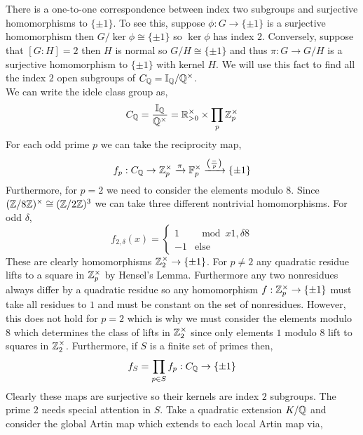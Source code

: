 \documentclass[12pt]{extarticle}
\begin{document}
\section{} 
There is a one-to-one correspondence between index two subgroups and surjective homomorphisms to $\{ \pm 1 \}$. To see this, suppose $\phi : G \to \{ \pm 1 \}$ is a surjective homomorphism then $G/ \ker{\phi} \cong \{ \pm 1 \}$ so $\ker{\phi}$ has index $2$. Conversely, suppose that $[G : H] = 2$ then $H$ is normal so $G/H \cong \{ \pm 1 \}$ and thus $\pi : G \to G/H$ is a surjective homomorphism to $\{ \pm 1 \}$ with kernel $H$. We will use this fact to find all the index $2$ open subgroups of $C_{\mathbb{Q}} = \mathbb{I}_{\mathbb{Q}} / \mathbb{Q}^\times$.
\bigskip\\
We can write the idele class group as,
\[ C_{\mathbb{Q}} = \frac{\mathbb{I}_{\mathbb{Q}}}{\mathbb{Q}^\times} = \mathbb{R}^\times_{> 0} \times \prod_p \mathbb{Z}_p^\times \]
For each odd prime $p$ we can take the reciprocity map, 
\[ f_p : C_{\mathbb{Q}} \to \mathbb{Z}_p^\times \xrightarrow{\pi} \mathbb{F}_{p}^\times \xrightarrow{\left(\frac{-}{p} \right)} \{ \pm 1 \} \]
Furthermore, for $p = 2$ we need to consider the elements modulo $8$. Since $(\mathbb{Z} / 8 \mathbb{Z})^\times \cong (\mathbb{Z} / 2 \mathbb{Z})^3$ we can take three different nontrivial homomorphisms. For odd $\delta$,
\[ f_{2, \delta}(x) = 
\begin{cases}
1 & \mod{x}{1,\delta}{8}
\\
-1 & \text{else}
\end{cases}\]
These are clearly homomorphisms $\mathbb{Z}_2^\times \to \{ \pm 1 \}$. For $p \neq 2$ any quadratic residue lifts to a square in $\mathbb{Z}_p^\times$ by Hensel's Lemma. Furthermore any two nonresidues always differ by a quadratic residue so any homomorphism $f : \mathbb{Z}_p^\times \to \{ \pm 1 \}$ must take all residues to $1$ and must be constant on the set of nonresidues. However, this does not hold for $p = 2$ which is why we must consider the elements modulo $8$ which determines the class of lifts in $\mathbb{Z}_2^\times$ since only elements $1$ modulo $8$ lift to squares in $\mathbb{Z}_2^\times$. 
Furthermore, if $S$ is a finite set of primes then,
\[ f_S = \prod_{p \in S} f_p : C_{\mathbb{Q}} \to \{ \pm 1 \} \]
Clearly these maps are surjective so their kernels are index $2$ subgroups. The prime $2$ needs special attention in $S$. 
Take a quadratic extension $K / \mathbb{Q}$ and consider the global Artin map which extends to each local Artin map via,
\begin{center}
\end{center}
\end{document}
